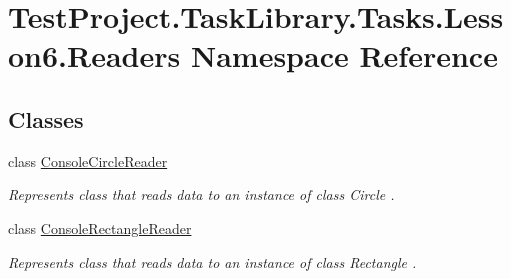 \hypertarget{namespace_test_project_1_1_task_library_1_1_tasks_1_1_lesson6_1_1_readers}{}\section{Test\+Project.\+Task\+Library.\+Tasks.\+Lesson6.\+Readers Namespace Reference}
\label{namespace_test_project_1_1_task_library_1_1_tasks_1_1_lesson6_1_1_readers}
\subsection*{Classes}
\begin{DoxyCompactItemize}
\item 
class \mbox{\hyperlink{class_test_project_1_1_task_library_1_1_tasks_1_1_lesson6_1_1_readers_1_1_console_circle_reader}{Console\+Circle\+Reader}}
\begin{DoxyCompactList}\small\item\em Represents class that reads data to an instance of class Circle . \end{DoxyCompactList}\item 
class \mbox{\hyperlink{class_test_project_1_1_task_library_1_1_tasks_1_1_lesson6_1_1_readers_1_1_console_rectangle_reader}{Console\+Rectangle\+Reader}}
\begin{DoxyCompactList}\small\item\em Represents class that reads data to an instance of class Rectangle . \end{DoxyCompactList}\end{DoxyCompactItemize}
